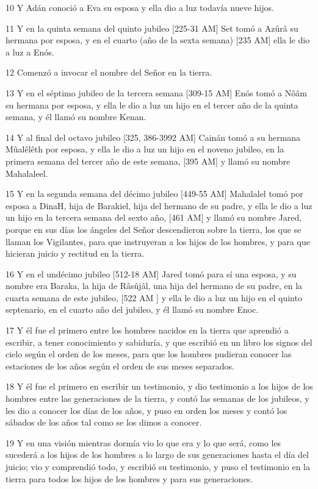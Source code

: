 \par 10 Y Adán conoció a Eva su esposa y ella dio a luz todavía nueve hijos.
\par 11 Y en la quinta semana del quinto jubileo [225-31 AM] Set tomó a Azûrâ su hermana por esposa, y en el cuarto (año de la sexta semana) [235 AM] ella le dio a luz a Enós.
\par 12 Comenzó a invocar el nombre del Señor en la tierra.
\par 13 Y en el séptimo jubileo de la tercera semana [309-15 AM] Enós tomó a Nôâm su hermana por esposa, y ella le dio a luz un hijo en el tercer año de la quinta semana, y él llamó su nombre Kenan.
\par 14 Y al final del octavo jubileo [325, 386-3992 AM] Cainán tomó a su hermana Mûalêlêth por esposa, y ella le dio a luz un hijo en el noveno jubileo, en la primera semana del tercer año de este semana, [395 AM] y llamó su nombre Mahalaleel.
\par 15 Y en la segunda semana del décimo jubileo [449-55 AM] Mahalalel tomó por esposa a DinaH, hija de Barakiel, hija del hermano de su padre, y ella le dio a luz un hijo en la tercera semana del sexto año, [461 AM] y llamó su nombre Jared, porque en sus días los ángeles del Señor descendieron sobre la tierra, los que se llaman los Vigilantes, para que instruyeran a los hijos de los hombres, y para que hicieran juicio y rectitud en la tierra.
\par 16 Y en el undécimo jubileo [512-18 AM] Jared tomó para sí una esposa, y su nombre era Baraka, la hija de Râsûjâl, una hija del hermano de su padre, en la cuarta semana de este jubileo, [522 AM ] y ella le dio a luz un hijo en el quinto septenario, en el cuarto año del jubileo, y él llamó su nombre Enoc.
\par 17 Y él fue el primero entre los hombres nacidos en la tierra que aprendió a escribir, a tener conocimiento y sabiduría, y que escribió en un libro los signos del cielo según el orden de los meses, para que los hombres pudieran conocer las estaciones de los años según el orden de sus meses separados.
\par 18 Y él fue el primero en escribir un testimonio, y dio testimonio a los hijos de los hombres entre las generaciones de la tierra, y contó las semanas de los jubileos, y les dio a conocer los días de los años, y puso en orden los meses y contó los sábados de los años tal como se los dimos a conocer.
\par 19 Y en una visión mientras dormía vio lo que era y lo que será, como les sucederá a los hijos de los hombres a lo largo de sus generaciones hasta el día del juicio; vio y comprendió todo, y escribió su testimonio, y puso el testimonio en la tierra para todos los hijos de los hombres y para sus generaciones.
